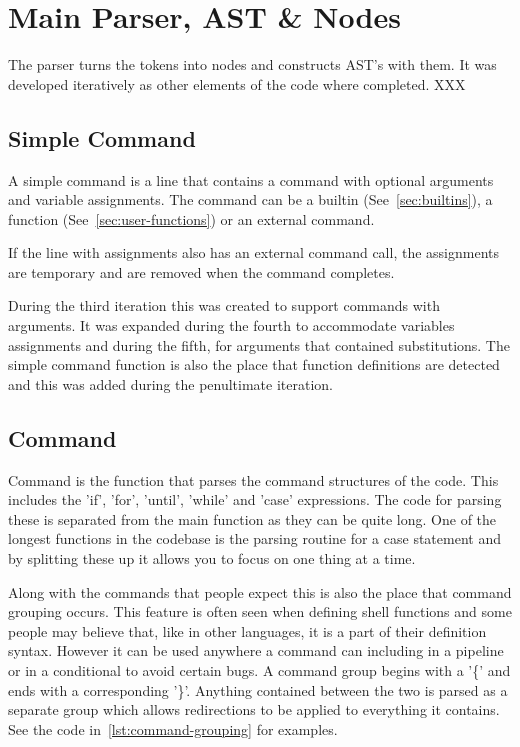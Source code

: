 \section{Main Parser, AST \& Nodes}
The parser turns the tokens into nodes and constructs AST's with them.
It was developed iteratively as other elements of the code where completed. XXX

\subsection{Simple Command}
A simple command is a line that contains a command with optional arguments and variable assignments.
The command can be a builtin (See~\ref{sec:builtins}), a function (See~\ref{sec:user-functions}) or an external command.

If the line with assignments also has an external command call, the assignments are temporary and are removed when the command completes.

During the third iteration this was created to support commands with arguments.
It was expanded during the fourth to accommodate variables assignments and during the fifth, for arguments that contained substitutions.
The simple command function is also the place that function definitions are detected and this was added during the penultimate iteration.

\subsection{Command}
Command is the function that parses the command structures of the code.
This includes the 'if', 'for', 'until', 'while' and 'case' expressions.
The code for parsing these is separated from the main function as they can be quite long.
One of the longest functions in the codebase is the parsing routine for a case statement and by splitting these up it allows you to focus on one thing at a time.

Along with the commands that people expect this is also the place that command grouping occurs.
This feature is often seen when defining shell functions and some people may believe that, like in other languages, it is a part of their definition syntax.
However it can be used anywhere a command can including in a pipeline or in a conditional to avoid certain bugs.
A command group begins with a '\{' and ends with a corresponding '\}'.
Anything contained between the two is parsed as a separate group which allows redirections to be applied to everything it contains.
See the code in~\ref{lst:command-grouping} for examples.

